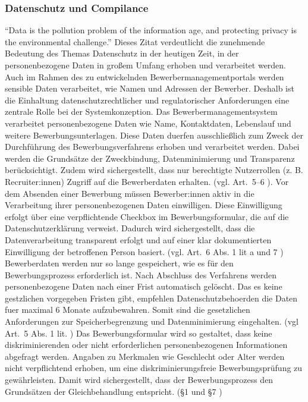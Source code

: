\subsubsection{Datenschutz und Compilance}
\enquote{Data is the pollution problem of the information age, and protecting privacy is the environmental challenge.}
\parencite[S.~1]{schneier2015}
\newline
Dieses Zitat verdeutlicht die zunehmende Bedeutung des Themas Datenschutz in der heutigen Zeit, in der personenbezogene Daten in großem Umfang erhoben und verarbeitet werden. 
Auch im Rahmen des zu entwickelnden Bewerbermanagementportals werden sensible Daten verarbeitet, wie Namen und Adressen der Bewerber. 
Deshalb ist die Einhaltung datenschutzrechtlicher und regulatorischer Anforderungen eine zentrale Rolle bei der Systemkonzeption.
\newline
Das Bewerbermanagementsystem verarbeitet personenbezogene Daten wie Name, Kontaktdaten, Lebenslauf und weitere Bewerbungsunterlagen. 
Diese Daten duerfen ausschließlich zum Zweck der Durchführung des Bewerbungsverfahrens erhoben und verarbeitet werden. 
Dabei werden die Grundsätze der Zweckbindung, Datenminimierung und Transparenz berücksichtigt. 
Zudem wird sichergestellt, dass nur berechtigte Nutzerrollen (z. B. Recruiter:innen) Zugriff auf die Bewerberdaten erhalten. (vgl. Art.~5–6 \parencite{dsgvo}).
\newline
Vor dem Absenden einer Bewerbung müssen Bewerber:innen aktiv in die Verarbeitung ihrer personenbezogenen Daten einwilligen. 
Diese Einwilligung erfolgt über eine verpflichtende Checkbox im Bewerbungsformular, die auf die Datenschutzerklärung verweist. 
Dadurch wird sichergestellt, dass die Datenverarbeitung transparent erfolgt und auf einer klar dokumentierten Einwilligung der betroffenen Person basiert. (vgl. Art.~6 Abs. 1 lit a und 7 \parencite{dsgvo})
\newline
Bewerberdaten werden nur so lange gespeichert, wie es für den Bewerbungsprozess erforderlich ist. 
Nach Abschluss des Verfahrens werden personenbezogene Daten nach einer Frist automatisch gelöscht. 
Das es keine gestzlichen vorgegeben Fristen gibt, empfehlen Datenschutzbehoerden die Daten fuer maximal 6 Monate aufzubewahren. 
Somit sind die gesetzlichen Anforderungen zur Speicherbegrenzung und Datenminimierung eingehalten. (vgl Art.~5 Abs. 1 lit. \parencite{dsgvo})
\newline
Das Bewerbungsformular wird so gestaltet, dass keine diskriminierenden oder nicht erforderlichen personenbezogenen Informationen abgefragt werden. 
Angaben zu Merkmalen wie Geschlecht oder Alter werden nicht verpflichtend erhoben, um eine diskriminierungsfreie Bewerbungsprüfung zu gewährleisten. 
Damit wird sichergestellt, dass der Bewerbungsprozess den Grundsätzen der Gleichbehandlung entspricht. (§1 und §7 \parencite{agg})
